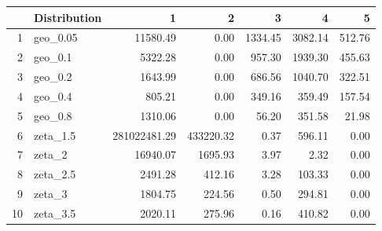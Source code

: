\begin{table}[ht]
\centering
\begin{tabular}{rlrrrrr}
  \hline
 & Distribution & 1 & 2 & 3 & 4 & 5 \\ 
  \hline
1 & geo\_0.05 & 11580.49 & 0.00 & 1334.45 & 3082.14 & 512.76 \\ 
  2 & geo\_0.1 & 5322.28 & 0.00 & 957.30 & 1939.30 & 455.63 \\ 
  3 & geo\_0.2 & 1643.99 & 0.00 & 686.56 & 1040.70 & 322.51 \\ 
  4 & geo\_0.4 & 805.21 & 0.00 & 349.16 & 359.49 & 157.54 \\ 
  5 & geo\_0.8 & 1310.06 & 0.00 & 56.20 & 351.58 & 21.98 \\ 
  6 & zeta\_1.5 & 281022481.29 & 433220.32 & 0.37 & 596.11 & 0.00 \\ 
  7 & zeta\_2 & 16940.07 & 1695.93 & 3.97 & 2.32 & 0.00 \\ 
  8 & zeta\_2.5 & 2491.28 & 412.16 & 3.28 & 103.33 & 0.00 \\ 
  9 & zeta\_3 & 1804.75 & 224.56 & 0.50 & 294.81 & 0.00 \\ 
  10 & zeta\_3.5 & 2020.11 & 275.96 & 0.16 & 410.82 & 0.00 \\ 
   \hline
\end{tabular}
\end{table}
